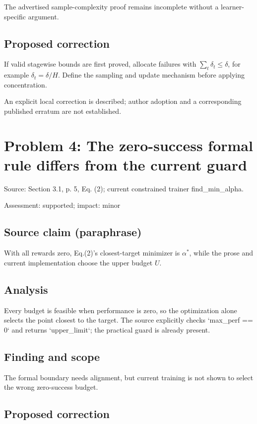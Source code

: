 \documentclass[11pt]{article}
\begin{document}
The advertised sample-complexity proof remains incomplete without a learner-specific argument.

\subsection*{Proposed correction}

If valid stagewise bounds are first proved, allocate failures with \(\sum_t\delta_t\leq\delta\), for example \(\delta_t=\delta/H\). Define the sampling and update mechanism before applying concentration.

An explicit local correction is described; author adoption and a corresponding published erratum are not established.

\section*{Problem 4: The zero-success formal rule differs from the current guard}

Source: Section 3.1, p. 5, Eq. (2); current constrained trainer find\_min\_alpha.

Assessment: supported; impact: minor

\subsection*{Source claim (paraphrase)}

With all rewards zero, Eq.(2)’s closest-target minimizer is \(\alpha^*\), while the prose and current implementation choose the upper budget \(U\).

\subsection*{Analysis}

Every budget is feasible when performance is zero, so the optimization alone selects the point closest to the target. The source explicitly checks `max\_perf == 0` and returns `upper\_limit`; the practical guard is already present.

\subsection*{Finding and scope}

The formal boundary needs alignment, but current training is not shown to select the wrong zero-success budget.

\subsection*{Proposed correction}
\end{document}
